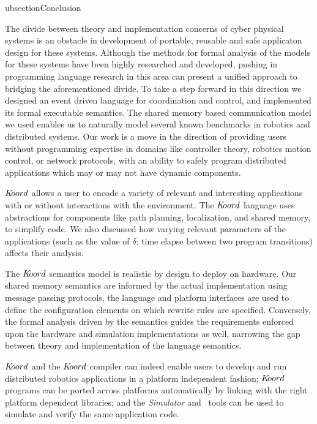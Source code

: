 ubsection{Conclusion}
\label{sec:conclusion}


The divide between theory and implementation concerns of cyber physical systems is an obstacle in development of portable, reusable and safe applicaton design for these systems. Although the methods for formal analysis of the models for these systems have been highly researched and developed, pushing in programming language research in this area can present a unified approach to bridging the aforementioned divide. 
To take a step forward in this direction we designed an event driven language for coordination and control, and implemented its formal executable semantics. The shared memory based communication model we used enables us to naturally model several known benchmarks in robotics and distributed systems. Our work is a move in the direction of providing users without programming expertise in domains like controller theory, robotics motion control, or network protocols, with an ability to safely program distributed applications which may or may not have dynamic components. 

 $K\kern-2pt oord$ allows a user to encode a variety of relevant and interesting applications with or without interactions with the environment. The $K\kern-2pt oord$ language uses abstractions for components like path planning, localization, and shared memory, to simplify code. We also discussed how varying relevant parameters of the applications (such as the value of $\delta$: time elapse between two program transitions) affects their analysis.

The $K\kern-2pt oord$ semantics model is realistic by design to deploy on hardware. Our shared memory semantics are informed by the actual implementation using message passing protocols, the language and platform interfaces are used to define the configuration elements on which rewrite rules are specified. Conversely, the formal analysis driven by the semantics guides the requirements enforced upon the hardware and simulation implementations as well, narrowing the gap between theory and implementation of the language semantics. 

 $K\kern-2pt oord$ and the $K\kern-2pt oord$ compiler can indeed enable users to develop and run distributed robotics applications in a platform independent fashion; $K\kern-2pt oord$ programs can be ported across platforms automatically by linking with the right platform dependent libraries; and the \emph{Simulator} and \kbmc\ tools can be used to simulate and verify the same application code. 
